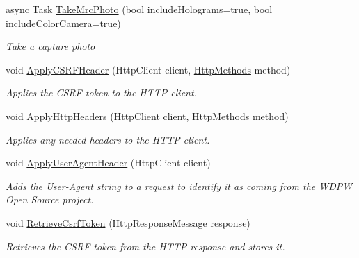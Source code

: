 \begin{DoxyCompactItemize}
async Task \hyperlink{class_microsoft_1_1_tools_1_1_windows_device_portal_1_1_device_portal_acf01dcb6b2d793080b89c13a622978ef}{Take\+Mrc\+Photo} (bool include\+Holograms=true, bool include\+Color\+Camera=true)
\begin{DoxyCompactList}\small\item\em Take a capture photo \end{DoxyCompactList}\item 
void \hyperlink{class_microsoft_1_1_tools_1_1_windows_device_portal_1_1_device_portal_a6ce3dc50daa05db2f362793ee2f51867}{Apply\+C\+S\+R\+F\+Header} (Http\+Client client, \hyperlink{class_microsoft_1_1_tools_1_1_windows_device_portal_1_1_device_portal_a3c9db9126f53fec96711064f3fd6ef00}{Http\+Methods} method)
\begin{DoxyCompactList}\small\item\em Applies the C\+S\+RF token to the H\+T\+TP client. \end{DoxyCompactList}\item 
void \hyperlink{class_microsoft_1_1_tools_1_1_windows_device_portal_1_1_device_portal_a280bc2527b680a2c7ca5a7a2edb8843a}{Apply\+Http\+Headers} (Http\+Client client, \hyperlink{class_microsoft_1_1_tools_1_1_windows_device_portal_1_1_device_portal_a3c9db9126f53fec96711064f3fd6ef00}{Http\+Methods} method)
\begin{DoxyCompactList}\small\item\em Applies any needed headers to the H\+T\+TP client. \end{DoxyCompactList}\item 
void \hyperlink{class_microsoft_1_1_tools_1_1_windows_device_portal_1_1_device_portal_a18f072093ddbf26877317a7ba93e6f36}{Apply\+User\+Agent\+Header} (Http\+Client client)
\begin{DoxyCompactList}\small\item\em Adds the User-\/\+Agent string to a request to identify it as coming from the W\+D\+PW Open Source project. \end{DoxyCompactList}\item 
void \hyperlink{class_microsoft_1_1_tools_1_1_windows_device_portal_1_1_device_portal_a1e3c75236825578a57e87cc1a65576e1}{Retrieve\+Csrf\+Token} (Http\+Response\+Message response)
\begin{DoxyCompactList}\small\item\em Retrieves the C\+S\+RF token from the H\+T\+TP response and stores it. \end{DoxyCompactList}\item 

\end{DoxyCompactItemize}
